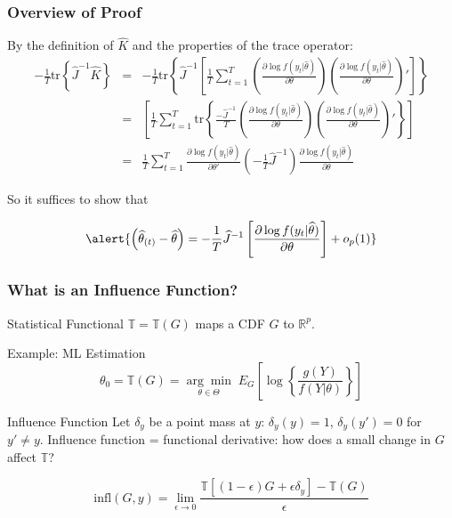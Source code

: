 \begin{frame}
  \frametitle{Overview of Proof}

By the definition of $\widehat{K}$ and the properties of the trace operator:
\footnotesize
\begin{eqnarray*}
		-\frac{1}{T}\mbox{tr}\left\{\widehat{J}^{-1} \widehat{K} \right\}
		&=& -\frac{1}{T}\mbox{tr}\left\{\widehat{J}^{-1}\left[\frac{1}{T}\sum_{t=1}^T \left(\frac{\partial \log f(y_t|\widehat{\theta})}{\partial \theta}\right) \left(\frac{\partial \log f(y_t|\widehat{\theta})}{\partial \theta}\right) '\right]\right\}\\ 
    &=& \left[\frac{1}{T}\sum_{t=1}^T \mbox{tr}\left\{\frac{-\widehat{J}^{-1}}{T}\left(\frac{\partial \log f(y_t|\widehat{\theta})}{\partial \theta}\right) \left(\frac{\partial \log f(y_t|\widehat{\theta})}{\partial \theta}\right) '\right\}\right]\\ 
    &=& \frac{1}{T}\sum_{t=1}^T \frac{\partial \log f(y_t|\widehat{\theta})}{\partial \theta'} \left(-\frac{1}{T}\widehat{J}^{-1}\right)\frac{\partial \log f(y_t|\widehat{\theta})}{\partial \theta} 
\end{eqnarray*}


\normalsize
So it suffices to show that
\vspace{-1em}

\[
  \alert{\left( \widehat{\theta}_{(t)} - \widehat{\theta}  \right) = -\frac{1}{T} \widehat{J}^{-1} \left[\frac{\partial \log f(y_t|\widehat{\theta})}{\partial \theta}\right] + o_p(1)}
\]

\end{frame}
\begin{frame}
  \frametitle{What is an Influence Function?}

  \begin{block}{Statistical Functional}
    $\mathbb{T}=\mathbb{T}(G)$ maps a CDF $G$ to $\mathbb{R}^p$.
  \end{block}

  

  \begin{block}{Example: ML Estimation}
    \vspace{-2em}
    \[\theta_0 = \mathbb{T}(G) = \underset{\theta \in \Theta}{\arg \min} \;E_G\left[\log\left\{\frac{g(Y)}{f(Y|\theta)} \right\} \right]\]
  \end{block}

  

  \begin{block}{Influence Function}
    Let $\delta_y$ be a \alert{point mass} at $y$: $\delta_y(y) = 1$, $\delta_y(y')=0$ for $y'\neq y$.
    Influence function = functional derivative: how does a small change in $G$ affect $\mathbb{T}$?

    \[\text{infl}(G,y) = \lim_{\epsilon \rightarrow 0} \frac{\mathbb{T}\left[\left(1-\epsilon\right)G + \epsilon \delta_y\right] - \mathbb{T}(G)}{\epsilon}\]
  \end{block}
\end{frame}
